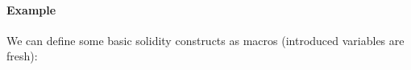 \documentclass[12pt]{extarticle}
\begin{document}



\paragraph{Example} We can define some basic solidity constructs as macros (introduced variables are fresh):
\end{document}
